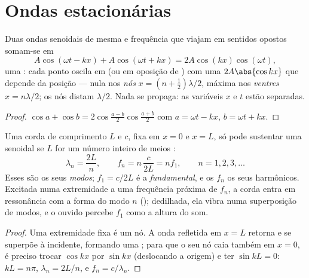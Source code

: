 \section{Ondas estacionárias}

\begin{theorem}\label{thm:b1:wave-propagation:standing}
Duas ondas senoidais de mesma  e frequência que viajam em
sentidos opostos somam-se em
\[
A\cos(\omega t - kx) + A\cos(\omega t + kx) = 2A\cos(kx)\cos(\omega t),
\]
uma \emph{}: cada ponto oscila em  (ou em oposição
de ) com uma  $2A\abs{\cos kx}$ que depende da posição ---
nula nos \emph{nós} $x = (n + \tfrac12)\lambda/2$, máxima nos
\emph{ventres} $x = n\lambda/2$; os nós distam $\lambda/2$. Nada
se propaga: as variáveis $x$ e $t$ estão separadas.
\end{theorem}

\begin{proof}
$\cos a + \cos b = 2\cos\frac{a - b}{2}\cos\frac{a + b}{2}$ com
$a = \omega t - kx$, $b = \omega t + kx$.
\end{proof}

\begin{proposition}\label{prop:b1:wave-propagation:modes}
Uma corda de comprimento $L$ e  $c$, fixa em $x = 0$ e $x = L$, só pode
sustentar uma  senoidal se $L$ for um número inteiro de
meios :
\[
\lambda_n = \frac{2L}{n}, \qquad f_n = n\,\frac{c}{2L} = n f_1,
\qquad n = 1, 2, 3, \dots
\]
Esses são os seus \emph{modos}; $f_1 = c/2L$ é a \emph{fundamental},
e os $f_n$ os seus harmônicos. Excitada numa extremidade a uma frequência próxima de
$f_n$, a corda entra em ressonância com a forma do modo $n$ (); dedilhada, ela vibra numa superposição de modos, e o
ouvido percebe $f_1$ como a altura do som.
\end{proposition}

\begin{proof}
Uma extremidade fixa é um nó. A onda refletida em $x = L$ retorna e
se superpõe à incidente, formando uma ; para que o seu nó
caia também em $x = 0$, é preciso trocar $\cos kx$ por $\sin kx$ (deslocando
a origem) e ter $\sin kL = 0$: $kL = n\pi$, $\lambda_n = 2L/n$, e
$f_n = c/\lambda_n$.
\end{proof}

